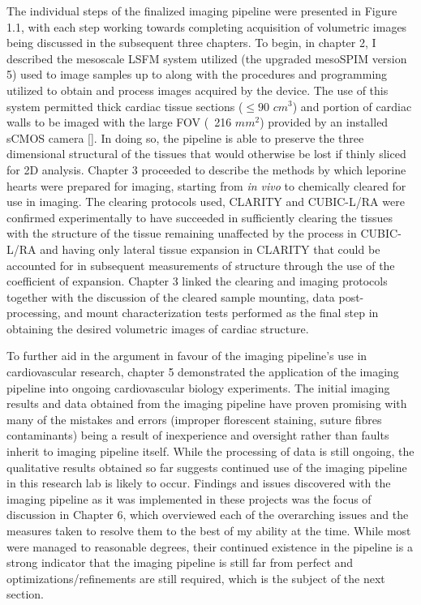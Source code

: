 The individual steps of the finalized imaging pipeline were presented in Figure 1.1, with each step working towards completing acquisition of volumetric images being discussed in the subsequent three chapters. To begin, in chapter 2, I described the mesoscale LSFM system utilized (the upgraded mesoSPIM version 5) used to image samples up to along with the procedures and programming utilized to obtain and process images acquired by the device. The use of this system permitted thick cardiac tissue sections ($\leq90$ $cm^3$) and portion of cardiac walls to be imaged with the large FOV (~216 $mm^2$) provided by an installed sCMOS camera []. In doing so, the pipeline is able to preserve the three dimensional structural of the tissues that would otherwise be lost if thinly sliced for 2D analysis. Chapter 3 proceeded to describe the methods by which leporine hearts were prepared for imaging, starting from \textit{in vivo} to chemically cleared for use in imaging. The clearing protocols used, CLARITY and CUBIC-L/RA were confirmed experimentally to have succeeded in sufficiently clearing the tissues with the structure of the tissue remaining unaffected by the process in CUBIC-L/RA and having only lateral tissue expansion in CLARITY that could be accounted for in subsequent measurements of structure through the use of the coefficient of expansion. Chapter 3 linked the clearing and imaging protocols together with the discussion of the cleared sample mounting, data post-processing, and mount characterization tests performed as the final step in obtaining the desired volumetric images of cardiac structure. 

To further aid in the argument in favour of the imaging pipeline's use in cardiovascular research, chapter 5 demonstrated the application of the imaging pipeline into ongoing cardiovascular biology experiments. The initial imaging results and data obtained from the imaging pipeline have proven promising with many of the mistakes and errors (improper florescent staining, suture fibres contaminants) being a result of inexperience and oversight  rather than faults inherit to imaging pipeline itself. While the processing of data is still ongoing, the qualitative results obtained so far suggests continued use of the imaging pipeline in this research lab is likely to occur. Findings and issues discovered with the imaging pipeline as it was implemented in these projects was the focus of discussion in Chapter 6, which overviewed each of the overarching issues and the measures taken to resolve them to the best of my ability at the time. While most were managed to reasonable degrees, their continued existence in the pipeline is a strong indicator that the imaging pipeline is still far from perfect and optimizations/refinements are still required, which is the subject of the next section.

